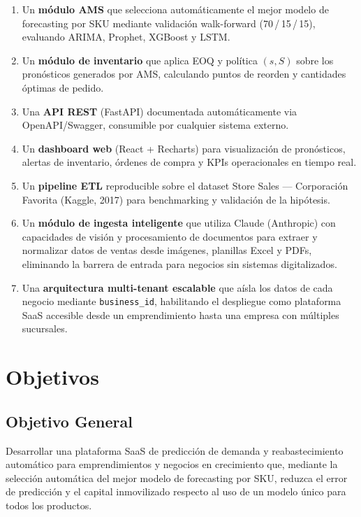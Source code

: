 \documentclass[12pt, a4paper]{report}
\begin{document}
\begin{enumerate}
  \item Un \textbf{módulo AMS} que selecciona automáticamente el mejor modelo de
        forecasting por SKU mediante validación walk-forward (70\,/\,15\,/\,15),
        evaluando ARIMA, Prophet, XGBoost y LSTM.
  \item Un \textbf{módulo de inventario} que aplica EOQ y política $(s,S)$ sobre los
        pronósticos generados por AMS, calculando puntos de reorden y cantidades óptimas
        de pedido.
  \item Una \textbf{API REST} (FastAPI) documentada automáticamente via OpenAPI/Swagger,
        consumible por cualquier sistema externo.
  \item Un \textbf{dashboard web} (React + Recharts) para visualización de pronósticos,
        alertas de inventario, órdenes de compra y KPIs operacionales en tiempo real.
  \item Un \textbf{pipeline ETL} reproducible sobre el dataset Store Sales — Corporación
        Favorita (Kaggle, 2017) para benchmarking y validación de la hipótesis.
  \item Un \textbf{módulo de ingesta inteligente} que utiliza Claude (Anthropic) con
        capacidades de visión y procesamiento de documentos para extraer y normalizar
        datos de ventas desde imágenes, planillas Excel y PDFs, eliminando la barrera
        de entrada para negocios sin sistemas digitalizados.
  \item Una \textbf{arquitectura multi-tenant escalable} que aísla los datos de cada
        negocio mediante \texttt{business\_id}, habilitando el despliegue como plataforma
        SaaS accesible desde un emprendimiento hasta una empresa con múltiples sucursales.
\end{enumerate}

\section{Objetivos}

\subsection{Objetivo General}

Desarrollar una plataforma SaaS de predicción de demanda y reabastecimiento automático
para emprendimientos y negocios en crecimiento que, mediante la selección automática del
mejor modelo de forecasting por SKU, reduzca el error de predicción y el capital
inmovilizado respecto al uso de un modelo único para todos los productos.
\end{document}
